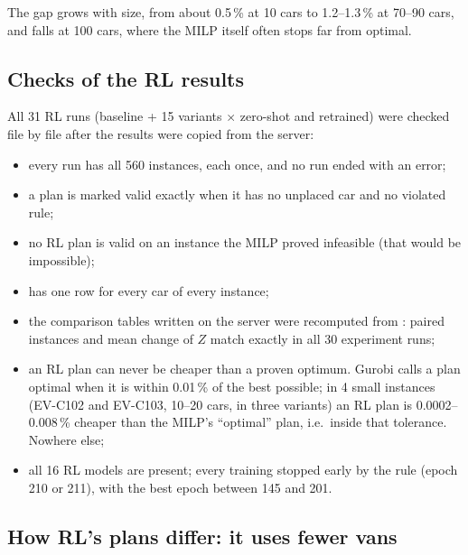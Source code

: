 The gap grows with size, from about 0.5\,\% at 10 cars to 1.2--1.3\,\% at 70--90 cars, and falls at 100 cars, where the MILP itself often stops far from optimal.


\subsection{Checks of the RL results}

All 31 RL runs (baseline + 15 variants $\times$ zero-shot and retrained) were checked file by file after the results were copied from the server:
\begin{itemize}
  \item every run has all 560 instances, each once, and no run ended with an error;
  \item a plan is marked valid exactly when it has no unplaced car and no violated rule;
  \item no RL plan is valid on an instance the MILP proved infeasible (that would be impossible);
  \item {} has one row for every car of every instance;
  \item the comparison tables written on the server were recomputed from : paired instances and mean change of $Z$ match exactly in all 30 experiment runs;
  \item an RL plan can never be cheaper than a proven optimum. Gurobi calls a plan optimal when it is within 0.01\,\% of the best possible; in 4 small instances (EV-C102 and EV-C103, 10--20 cars, in three variants) an RL plan is 0.0002--0.008\,\% cheaper than the MILP's ``optimal'' plan, i.e.\ inside that tolerance. Nowhere else;
  \item all 16 RL models are present; every training stopped early by the rule (epoch 210 or 211), with the best epoch between 145 and 201.
\end{itemize}


\subsection{How RL's plans differ: it uses fewer vans}

